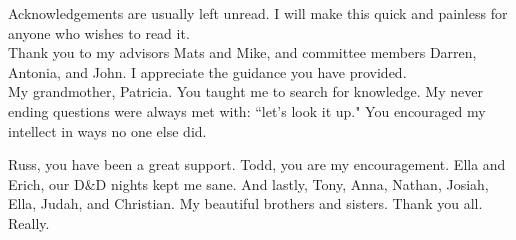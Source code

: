 Acknowledgements are usually left unread. I will make this quick and painless for anyone who wishes to read it. \\

Thank you to my advisors Mats and Mike, and committee members Darren, Antonia, and John. I appreciate the guidance you have provided.\\

My grandmother, Patricia. You taught me to search for knowledge.  My never ending questions were always met with: ``let's look it up." You encouraged my intellect in ways no one else did. 

Russ, you have been a great support. Todd, you are my encouragement. Ella and Erich, our D\&D nights kept me sane. %
And lastly, Tony, Anna, Nathan, Josiah, Ella, Judah, and Christian. My beautiful brothers and sisters. Thank you all. Really. 


